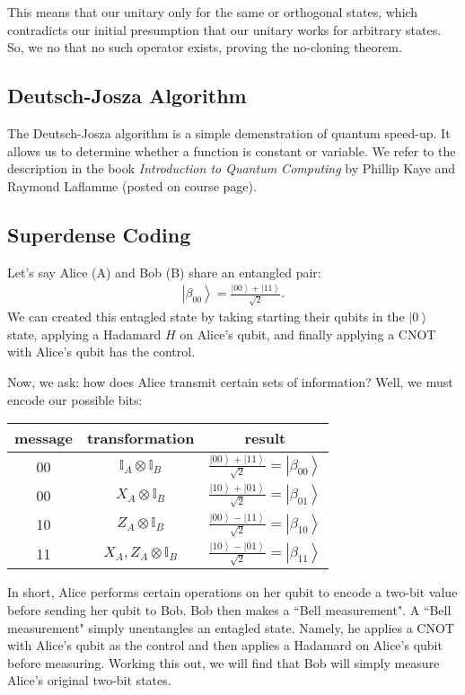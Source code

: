\documentclass[11pt]{article} %
\newcommand{\ket}[1]{\left|#1\right\rangle}
\begin{document}
This means that our unitary only for the same or orthogonal states, which contradicts our initial presumption that our unitary works for arbitrary states. So, we no that no such operator exists, proving the no-cloning theorem.

\subsection{Deutsch-Josza Algorithm}
The Deutsch-Josza algorithm is a simple demenstration of quantum speed-up. It allows us to determine whether a function is constant or variable. We refer to the description in the book \textit{Introduction to Quantum Computing} by Phillip Kaye and Raymond Laflamme (posted on course page).

\subsection{Superdense Coding}\label{superdense}
Let's say Alice (A) and Bob (B) share an entangled pair:
\begin{align}
    \ket{\beta_{00}}=\frac{\ket{00}+\ket{11}}{\sqrt{2}}.
    \label{beta00}
\end{align}
We can created this entagled state by taking starting their qubits in the $\ket{0}$ state, applying a Hadamard $H$ on Alice's qubit, and finally applying a CNOT with Alice's qubit has the control.

Now, we ask: how does Alice transmit certain sets of information? Well, we must encode our possible bits:
\begin{table}[!htbp]
    \centering
    \begin{tabular}{c|c c}
        message & transformation & result\\\hline
        00 & $\mathbb{I}_A\otimes\mathbb{I}_B$ & $\frac{\ket{00}+\ket{11}}{\sqrt{2}}=\ket{\beta_{00}}$\\
        00 & $X_A\otimes\mathbb{I}_B$ & $\frac{\ket{10}+\ket{01}}{\sqrt{2}}=\ket{\beta_{01}}$\\
        10 & $Z_A\otimes\mathbb{I}_B$ & $\frac{\ket{00}-\ket{11}}{\sqrt{2}}=\ket{\beta_{10}}$\\
        11 & $X_A,Z_A\otimes\mathbb{I}_B$ & $\frac{\ket{10}-\ket{01}}{\sqrt{2}}=\ket{\beta_{11}}$\\
    \end{tabular}
\end{table}
In short, Alice performs certain operations on her qubit to encode a two-bit value before sending her qubit to Bob. Bob then makes a ``Bell measurement". A ``Bell measurement" simply unentangles an entagled state. Namely, he applies a CNOT with Alice's qubit as the control and then applies a Hadamard on Alice's qubit before measuring. Working this out, we will find that Bob will simply measure Alice's original two-bit states.
\end{document}
